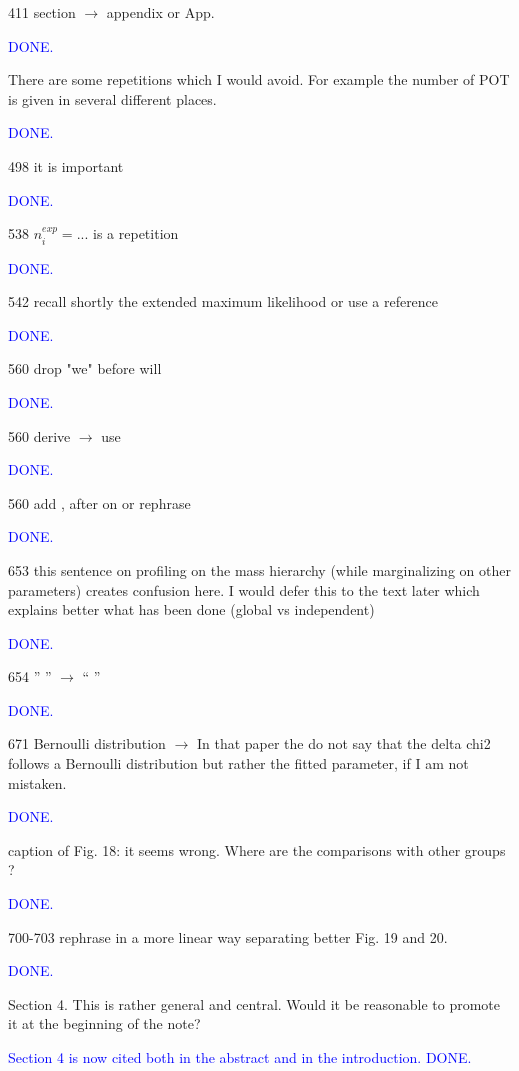 \documentclass[final]{elsarticle}
\begin{document}
411 section $\rightarrow$ appendix or App.

\textcolor{blue}{DONE.}

There are some repetitions which I would avoid. For example the number
of POT is given in several different places.

\textcolor{blue}{DONE.}

498 it is important

\textcolor{blue}{DONE.}

538 $n_i^{exp} = ...$ is a repetition

\textcolor{blue}{DONE.}

542 recall shortly the extended maximum likelihood or use a reference

\textcolor{blue}{DONE.}

560 drop "we" before will

\textcolor{blue}{DONE.}

560 derive $\rightarrow$ use

\textcolor{blue}{DONE.}

560 add , after on or rephrase

\textcolor{blue}{DONE.}

653 this sentence on profiling on the mass hierarchy (while marginalizing on
other parameters) creates confusion here. I would defer this to the text
later which explains better what has been done (global vs independent)

\textcolor{blue}{DONE.}

654 '' ''  $\rightarrow$ `` ''

\textcolor{blue}{DONE.}

671 Bernoulli distribution $\rightarrow$ In that paper the do not say that the delta chi2
follows a Bernoulli distribution but rather the fitted parameter, if I am not mistaken.

\textcolor{blue}{DONE.}

caption of Fig. 18: it seems wrong. Where are the comparisons with other groups ?

\textcolor{blue}{DONE.}

700-703 rephrase in a more linear way separating better Fig. 19 and 20.

\textcolor{blue}{DONE.}

Section 4. This is rather general and central. Would it be reasonable to promote it
at the beginning of the note?

\textcolor{blue}{Section 4 is now cited both in the abstract and in the introduction. DONE.}
\end{document}
